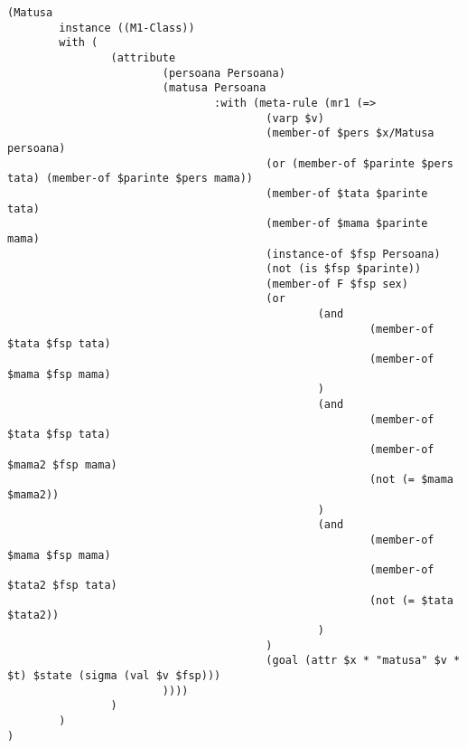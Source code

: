 \documentclass{article}
\begin{document}
{\begin{verbatim}
(Matusa
        instance ((M1-Class))
        with (
                (attribute
                        (persoana Persoana)
                        (matusa Persoana
                                :with (meta-rule (mr1 (=>
                                        (varp $v)
                                        (member-of $pers $x/Matusa persoana)
                                        (or (member-of $parinte $pers tata) (member-of $parinte $pers mama))
                                        (member-of $tata $parinte tata)
                                        (member-of $mama $parinte mama)
                                        (instance-of $fsp Persoana)
                                        (not (is $fsp $parinte))
                                        (member-of F $fsp sex)
                                        (or
                                                (and
                                                        (member-of $tata $fsp tata)
                                                        (member-of $mama $fsp mama)
                                                )
                                                (and
                                                        (member-of $tata $fsp tata)
                                                        (member-of $mama2 $fsp mama)
                                                        (not (= $mama $mama2))
                                                )
                                                (and
                                                        (member-of $mama $fsp mama)
                                                        (member-of $tata2 $fsp tata)
                                                        (not (= $tata $tata2))
                                                )
                                        )
                                        (goal (attr $x * "matusa" $v * $t) $state (sigma (val $v $fsp)))
                        ))))
                )
        )
)


\end{verbatim}}
\end{document}
